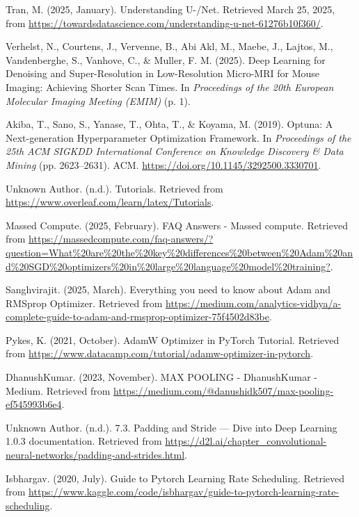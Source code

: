 \documentclass[twocolumn]{article}
\begin{document}
\begin{thebibliography}{99}
     Tran, M. (2025, January). Understanding U-/Net. Retrieved March 25, 2025, from \url{https://towardsdatascience.com/understanding-u-net-61276b10f360/}.
    
     Verhelst, N., Courtens, J., Vervenne, B., Abi Akl, M., Maebe, J., Lajtos, M., Vandenberghe, S., Vanhove, C., \& Muller, F. M. (2025). Deep Learning for Denoising and Super-Resolution in Low-Resolution Micro-MRI for Mouse Imaging: Achieving Shorter Scan Times. In \textit{Proceedings of the 20th European Molecular Imaging Meeting (EMIM)} (p. 1).
    
     Akiba, T., Sano, S., Yanase, T., Ohta, T., \& Koyama, M. (2019). Optuna: A Next-generation Hyperparameter Optimization Framework. In \textit{Proceedings of the 25th ACM SIGKDD International Conference on Knowledge Discovery \& Data Mining} (pp. 2623–2631). ACM. \url{https://doi.org/10.1145/3292500.3330701}.
    
     Unknown Author. (n.d.). Tutorials. Retrieved from \url{https://www.overleaf.com/learn/latex/Tutorials}.
    
     Massed Compute. (2025, February). FAQ Answers - Massed compute. Retrieved from \url{https://massedcompute.com/faq-answers/?question=What%20are%20the%20key%20differences%20between%20Adam%20and%20SGD%20optimizers%20in%20large%20language%20model%20training?}.
    
     Sanghvirajit. (2025, March). Everything you need to know about Adam and RMSprop Optimizer. Retrieved from \url{https://medium.com/analytics-vidhya/a-complete-guide-to-adam-and-rmsprop-optimizer-75f4502d83be}.
    
     Pykes, K. (2021, October). AdamW Optimizer in PyTorch Tutorial. Retrieved from \url{https://www.datacamp.com/tutorial/adamw-optimizer-in-pytorch}.
    
     DhanushKumar. (2023, November). MAX POOLING - DhanushKumar - Medium. Retrieved from \url{https://medium.com/@danushidk507/max-pooling-ef545993b6e4}.
    
     Unknown Author. (n.d.). 7.3. Padding and Stride — Dive into Deep Learning 1.0.3 documentation. Retrieved from \url{https://d2l.ai/chapter_convolutional-neural-networks/padding-and-strides.html}.
    
     Isbhargav. (2020, July). Guide to Pytorch Learning Rate Scheduling. Retrieved from \url{https://www.kaggle.com/code/isbhargav/guide-to-pytorch-learning-rate-scheduling}.
    

\end{thebibliography}
\end{document}
